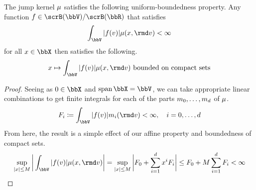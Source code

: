\begin{lemma}
  \label{lemma:affJump-regularity}
  The jump kernel $\mu$ satisfies the following uniform-boundedness property.
  Any function $f \in \scrB(\vecSpace)/\scrB(\bbR)$ that satisfies
  \[
    \int_\vecSpace |f(\markVar)| \affJump(\stateVar, \rmd\markVar) < \infty
  \]
  for all $\stateVar \in \stateSpace$ then satisfies the following.
  \[
    \stateVar \mapsto \int_\vecSpace |f(\markVar)| \affJump(\stateVar, \rmd\markVar)  \text{ bounded on compact sets}
  \]
\end{lemma}
\begin{proof}
  \label{proof:lemma:affJump-regularity}
  Seeing as $0 \in \stateSpace$ and $\operatorname{span}\stateSpace = \vecSpace$, we can take appropriate linear combinations to get finite integrals for each of the parts $m_0, \ldots, m_d$ of $\mu$.
  \begin{equation*}
    F_i \defeq \int_\vecSpace |f(\markVar)| \affJumpPart_i(\rmd\markVar) < \infty, \quad i = 0, \ldots, d
  \end{equation*}
  From here, the result is a simple effect of our affine property and boundedness of compact sets.
  \begin{equation*}
    \sup_{|\stateVar|\leq M} \bigg| \int_\vecSpace |f(\markVar)| \affJump(\stateVar, \rmd\markVar) \bigg| = \sup_{|\stateVar|\leq M} \bigg| F_0 + \sum_{i=1}^d \stateVar^i F_i \bigg| \leq F_0 + M \sum_{i=1}^d F_i < \infty
  \end{equation*}
\end{proof}
